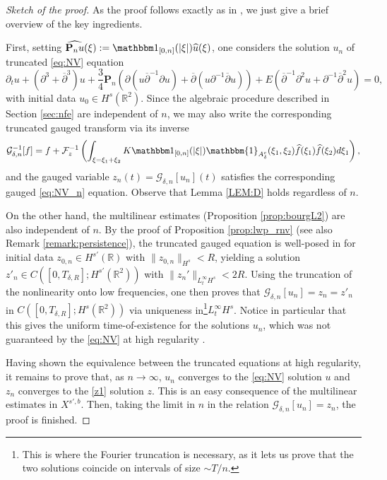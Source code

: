\documentclass[a4paper,
11pt,  reqno]{amsart}
\newcommand{\5}{\textup{V}}
\newcommand{\ind}{\mathbbm 1}
\newcommand{\F}{\mathcal{F}}
\theoremstyle{remark}
\newcommand{\R}{\mathbb{R}}
\numberwithin{equation}{section}
\numberwithin{theorem}{section}
\begin{document}
\begin{proof}[Sketch of the proof] As the proof follows exactly as in \cite[Section 5]{chcora}, we just give a brief overview of the key ingredients.

\smallskip
First, setting $\widehat{\mathbf{P}_nu}(\xi):=\ind_{[0,n]}(|\xi|)\widehat{u}(\xi)$, one considers the solution $u_n$ of truncated \eqref{eq:NV} equation
\begin{equation}\tag{NV$_n$}\label{eq:NV_n}
	\partial_t u + (\partial^3 + \overline{\partial}^3)u + \frac34\mathbf{P}_n(\partial(u\overline{\partial}^{-1}\partial u) + \overline{\partial}(u\partial^{-1}\overline{\partial}u)) + E(\overline{\partial}^{-1}\partial^2 u + \partial^{-1}\overline{\partial}^2 u)=0,
\end{equation}
with initial data $u_0\in H^s(\R^2)$.
Since the algebraic procedure described in Section \ref{sec:nfe} are independent of $n$, we may also write the corresponding truncated gauged transform via its inverse
\begin{equation}\label{eq:gauge_n}
\mathcal{G}_{\delta,n}^{-1}[f]=f+\F_{z}^{-1}\left(\int_{\xi=\xi_1+\xi_2} K\ind_{[0,n]}(|\xi|)\mathbbm{1}_{A^c_\delta}(\xi_1,\xi_2)\widehat{f}(\xi_1)\widehat{f}(\xi_2)d\xi_1\right),
\end{equation}
and the gauged variable $z_n(t)=\mathcal{G}_{\delta,n}[u_n](t)$ satisfies the corresponding gauged \eqref{eq:NV_n} equation. Observe that Lemma \ref{LEM:D} holds regardless of $n$.

\smallskip
On the other hand, the multilinear estimates (Proposition \ref{prop:bourgL2})  are also independent of $n$. By the proof of Proposition \ref{prop:lwp_rnv} (see also Remark \ref{remark:persistence}), the truncated gauged equation is well-posed in for initial data $z_{0,n}\in H^{s'}(\R)$ with $\|z_{0,n}\|_{H^s}<R$, yielding a solution $z'_{n}\in C([0,T_{\delta,R}]; H^{s'}(\R^2))$ with $\|z_{n}'\|_{L^\infty_tH^s}<2R$. Using the truncation of the nonlinearity onto low frequencies, one then proves that $\mathcal{G}_{\delta,n}[u_n]=z_n=z'_n$ in $C([0,T_{\delta,R}]; H^s(\R^2))$ via uniqueness in\footnote{This is where the Fourier truncation is necessary, as it lets us prove that the two solutions coincide on intervals of size $\sim T/n$.}$L^\infty_tH^s$. Notice in particular that this gives the uniform time-of-existence for the solutions $u_n$, which was not guaranteed by the \eqref{eq:NV} at high regularity \cite{angelopolous, kazeykinamunoz1, kazeykinamunoz2}.

\smallskip
Having shown the equivalence between the truncated equations at high regularity, it remains to prove that, as $n\to \infty$, $u_n$ converges to the \eqref{eq:NV} solution $u$ and $z_n$ converges to the \eqref{z1} solution $z$. This is an easy consequence of the multilinear estimates in $X^{s',b}$. Then, taking the limit in $n$ in the relation $\mathcal{G}_{\delta,n}[u_n]=z_n$, the proof is finished.
\end{proof}
\end{document}
